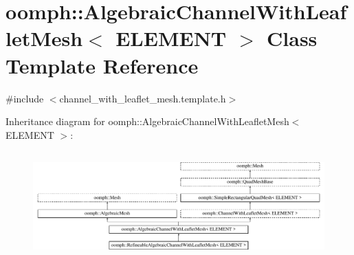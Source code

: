 \hypertarget{classoomph_1_1AlgebraicChannelWithLeafletMesh}{}\section{oomph\+:\+:Algebraic\+Channel\+With\+Leaflet\+Mesh$<$ E\+L\+E\+M\+E\+NT $>$ Class Template Reference}
\label{classoomph_1_1AlgebraicChannelWithLeafletMesh}


{\ttfamily \#include $<$channel\+\_\+with\+\_\+leaflet\+\_\+mesh.\+template.\+h$>$}

Inheritance diagram for oomph\+:\+:Algebraic\+Channel\+With\+Leaflet\+Mesh$<$ E\+L\+E\+M\+E\+NT $>$\+:\begin{figure}[H]
\begin{center}
\leavevmode
\includegraphics[height=4.200000cm]{classoomph_1_1AlgebraicChannelWithLeafletMesh}
\end{center}
\end{figure}

